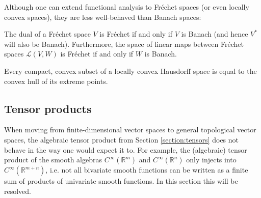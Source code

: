     Although one can extend functional analysis to Fr\'echet spaces (or even locally convex spaces), they are less well-behaved than Banach spaces:
    \begin{property}
        The dual of a Fr\'echet space $V$ is Fr\'echet if and only if $V$ is Banach (and hence $V^*$ will also be Banach). Furthermore, the space of linear maps between Fr\'echet spaces $\mathcal{L}(V,W)$ is Fr\'echet if and only if $W$ is Banach.
    \end{property}

    \begin{property}\label{functional:krein_milman}
        Every compact, convex subset of a locally convex Hausdorff space is equal to the convex hull of its extreme points.
    \end{property}

\subsection{Tensor products}

    When moving from finite-dimensional vector spaces to general topological vector spaces, the algebraic tensor product from Section \ref{section:tensors} does not behave in the way one would expect it to. For example, the (algebraic) tensor product of the smooth algebras $C^\infty(\mathbb{R}^m)$ and $C^\infty(\mathbb{R}^n)$ only injects into $C^\infty(\mathbb{R}^{m+n})$, i.e. not all bivariate smooth functions can be written as a finite sum of products of univariate smooth functions. In this section this will be resolved.


